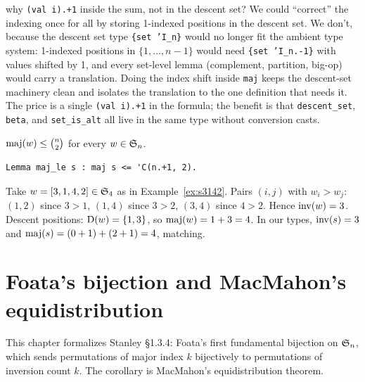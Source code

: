 \begin{sidebar}{why \texttt{(val i).+1} inside the sum, not in the descent set?}
We could ``correct'' the indexing once for all by storing
1-indexed positions in the descent set. We don't, because the
descent set type \texttt{\{set 'I\_n\}} would no longer fit the
ambient type system: 1-indexed positions in $\{1, \dots, n-1\}$
would need \texttt{\{set 'I\_n.-1\}} with values shifted by 1, and
every set-level lemma (complement, partition, big-op) would carry
a translation. Doing the index shift inside \texttt{maj} keeps the
descent-set machinery clean and isolates the translation to the
one definition that needs it. The price is a single
\texttt{(val i).+1} in the formula; the benefit is that
\texttt{descent\_set}, \texttt{beta}, and \texttt{set\_is\_alt}
all live in the same type without conversion casts.
\end{sidebar}

\begin{lemma}
  $\mathrm{maj}(w) \leq \binom{n}{2}$ for every $w \in \mathfrak{S}_{n}$.
\end{lemma}

\begin{lstlisting}[language=Rocq]
Lemma maj_le s : maj s <= 'C(n.+1, 2).
\end{lstlisting}


\begin{example}[{Stanley's $w = [3,1,4,2]$, statistics}]
  Take $w = [3,1,4,2] \in \mathfrak{S}_{4}$ as in Example~\ref{ex:s3142}.
  Pairs $(i, j)$ with $w_i > w_j$: $(1,2)$ since $3 > 1$, $(1,4)$
  since $3 > 2$, $(3,4)$ since $4 > 2$. Hence $\mathrm{inv}(w) = 3$.
  Descent positions: $\mathrm{D}(w) = \{1, 3\}$, so
  $\mathrm{maj}(w) = 1 + 3 = 4$. In our types,
  $\mathrm{inv}(s) = 3$ and $\mathrm{maj}(s) = (0+1) + (2+1) = 4$, matching.
\end{example}

\clearpage

\chapter{Foata's bijection and MacMahon's equidistribution}
\label{ch:foata}

This chapter formalizes Stanley \S1.3.4: Foata's first fundamental
bijection on $\mathfrak{S}_{n}$, which sends permutations of major index $k$
bijectively to permutations of inversion count $k$. The corollary is
MacMahon's equidistribution theorem.

